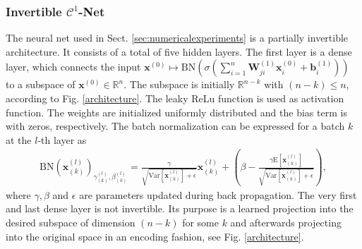 \documentclass[envcountsect,runningheads]{llncs}
\begin{document}
\subsubsection{Invertible $\mathcal{C}^1$-Net}
\label{appx:invarch}
The neural net used in Sect. \ref{sec:numericalexperiments} is a partially invertible architecture. It consists of a total of five hidden layers. The first layer is a dense layer, which connects the input $\mathbf{x}^{(0)} \mapsto \text{BN}\left(\sigma\left(\sum_{i=1}^{n} \textbf{W}^{(1)}_{ji}\mathbf{x}^{(0)}_{i} + \mathbf{b}^{(1)}_{i}\right)\right)$ to a subspace of $\mathbf{x}^{(0)} \in \mathbb{R}^n$. The subspace is initially $\mathbb{R}^{n-k}$ with $(n-k) \leq n$, according to Fig. \ref{architecture}. The leaky ReLu function is used as activation function. The weights are initialized uniformly distributed and the bias term is with zeros, respectively. The batch normalization can be expressed for a batch $k$ at the $l$-th layer as
\begin{align}
	\text{BN}(\mathbf{x}^{(l)}_{(k)})_{\gamma^{(l)}_{(k)},\beta^{(l)}_{(k)}} = \frac{\gamma}{\sqrt{\text{Var}[\mathbf{x}^{(l)}_{(k)}] + \epsilon}} \mathbf{x}^{(l)}_{(k)} + \left( \beta - \frac{\gamma \text{E}[\mathbf{x}^{(l)}_{(k)}]}{\sqrt{\text{Var}[\mathbf{x}^{(l)}_{(k)}]+\epsilon}} \right),
\end{align}
where $\gamma,\beta$ and $\epsilon$ are parameters updated during back propagation. The very first and last dense layer is not invertible. Its purpose is a learned projection into the desired subspace of dimension $(n-k)$ for some $k$ and afterwards projecting into the original space in an encoding fashion, see Fig. \ref{architecture}.
\end{document}
